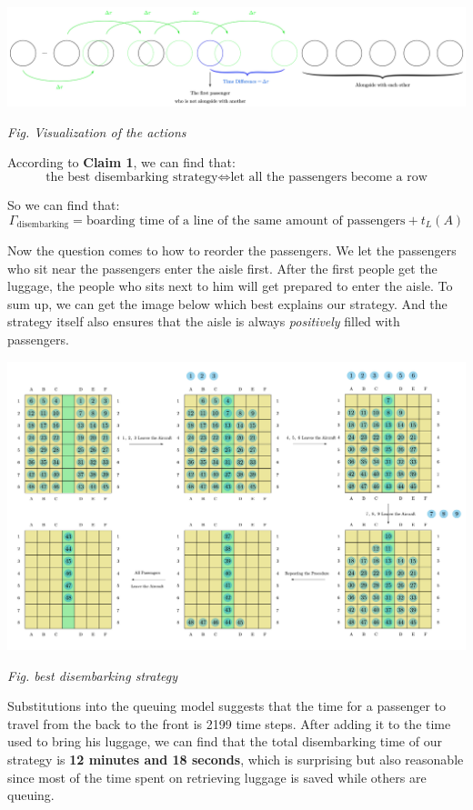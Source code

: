 \documentclass{article}
\begin{document}
	\begin{center}
		\includegraphics[width = 14cm]{display of Delta tau.jpg}

		\small\textit{Fig. Visualization of the actions}
	\end{center}

	According to \textbf{Claim 1}, we can find that:
	$$\text{the best disembarking strategy}\Leftrightarrow
	\text{let all the passengers become a row}$$

	So we can find that:
	$$\Gamma_\text{disembarking}=\text{boarding time of a line of the same amount of passengers}+t_L(A)$$

	Now the question comes to how to reorder the passengers. We let the passengers who sit near the passengers enter the aisle first. After the first people get the luggage, the people who sits next to him will get prepared to enter the aisle. To sum up, we can get the image below which best explains our strategy. And the strategy itself also ensures that the aisle is always \textit{positively} filled with passengers.

	\begin{center}
		\includegraphics[width=15cm]{disembarking.jpg}

		\small \textit{Fig. best disembarking strategy}
	\end{center}

	Substitutions into the queuing model suggests that the time for a passenger to travel from the back to the front is 2199 time steps. After adding it to the time used to bring his luggage, we can find that the total disembarking time of our strategy is \textbf{12 minutes and 18 seconds}, which is surprising but also reasonable since most of the time spent on retrieving luggage is saved while others are queuing.
\end{document}

